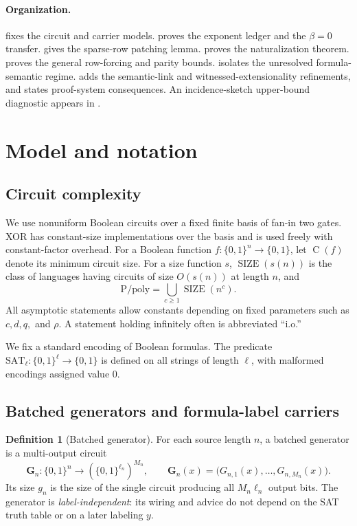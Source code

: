 \documentclass[11pt]{article}
\theoremstyle{definition}
\newtheorem{definition}[theorem]{Definition}
\newcommand{\bits}{\{0,1\}}
\newcommand{\SIZE}{\operatorname{SIZE}}
\newcommand{\Ckt}{\operatorname{C}}
\newcommand{\SAT}{\mathrm{SAT}}
\newcommand{\Ppoly}{\mathrm{P/poly}}
\newcommand{\Gn}{\mathbf{G}_n}
\begin{document}
\paragraph{Organization.}
 fixes the circuit and carrier models.  proves the exponent ledger and the $\beta=0$ transfer.  gives the sparse-row patching lemma.  proves the naturalization theorem.  proves the general row-forcing and parity bounds.  isolates the unresolved formula-semantic regime.  adds the semantic-link and witnessed-extensionality refinements, and  states proof-system consequences. An incidence-sketch upper-bound diagnostic appears in .

\section{Model and notation}\label{sec:model}

\subsection{Circuit complexity}

We use nonuniform Boolean circuits over a fixed finite basis of fan-in two gates. XOR has constant-size implementations over the basis and is used freely with constant-factor overhead. For a Boolean function $f:\bits^n\to\bits$, let $\Ckt(f)$ denote its minimum circuit size. For a size function $s$, $\SIZE(s(n))$ is the class of languages having circuits of size $O(s(n))$ at length $n$, and
\[
  \Ppoly=\bigcup_{c\ge 1}\SIZE(n^c).
\]
All asymptotic statements allow constants depending on fixed parameters such as $c,d,q,$ and $\rho$. A statement holding infinitely often is abbreviated ``i.o.''

We fix a standard encoding of Boolean formulas. The predicate $\SAT_\ell:\bits^\ell\to\bits$ is defined on all strings of length $\ell$, with malformed encodings assigned value $0$.

\subsection{Batched generators and formula-label carriers}

\begin{definition}[Batched generator]\label{def:generator}
For each source length $n$, a batched generator is a multi-output circuit
\[
  \Gn:\bits^n\longrightarrow (\bits^{\ell_n})^{M_n},
  \qquad
  \Gn(x)=\bigl(G_{n,1}(x),\ldots,G_{n,M_n}(x)\bigr).
\]
Its size $g_n$ is the size of the single circuit producing all $M_n\ell_n$ output bits. The generator is \emph{label-independent}: its wiring and advice do not depend on the SAT truth table or on a later labeling $y$.
\end{definition}
\end{document}
